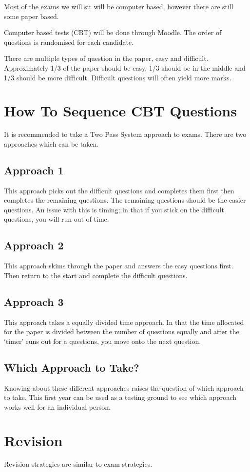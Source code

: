 
Most of the exams we will sit will be computer based, however there are still some paper based.

Computer based tests (CBT) will be done through Moodle. The order of questions is randomised for each candidate.

There are multiple types of question in the paper, easy and difficult. Approximately 1/3 of the paper should be easy, 1/3 should be in the middle and 1/3 should be more difficult. Difficult questions will often yield more marks.

\section*{How To Sequence CBT Questions}
It is recommended to take a Two Pass System approach to exams. There are two approaches which can be taken.
\subsection*{Approach 1}
This approach picks out the difficult questions and completes them first then completes the remaining questions. The remaining questions should be the easier questions. An issue with this is timing; in that if you stick on the difficult questions, you will run out of time.
\subsection*{Approach 2}
This approach skims through the paper and answers the easy questions first. Then return to the start and complete the difficult questions. 
\subsection*{Approach 3}
This approach takes a equally divided time approach. In that the time allocated for the paper is divided between the number of questions equally and after the `timer' runs out for a questions, you move onto the next question.
\subsection*{Which Approach to Take?}
Knowing about these different approaches raises the question of which approach to take. This first year can be used as a testing ground to see which approach works well for an individual person. 

\section*{Revision}
Revision strategies are similar to exam strategies.

